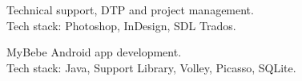 \documentclass[12pt, a4paper]{article}
\begin{document}
\begin{minipage}[t]{0.6\textwidth}
    \begin{sectionBody}
        \> Technical support, DTP and project management. \\
        \> Tech stack: Photoshop, InDesign, SDL Trados. \\
    \end{sectionBody}
     
    \begin{sectionBody}
        \> MyBebe Android app development. \\
        \> Tech stack: Java, Support Library, Volley, Picasso, SQLite. \\
    \end{sectionBody}
\end{minipage}
\end{document}
